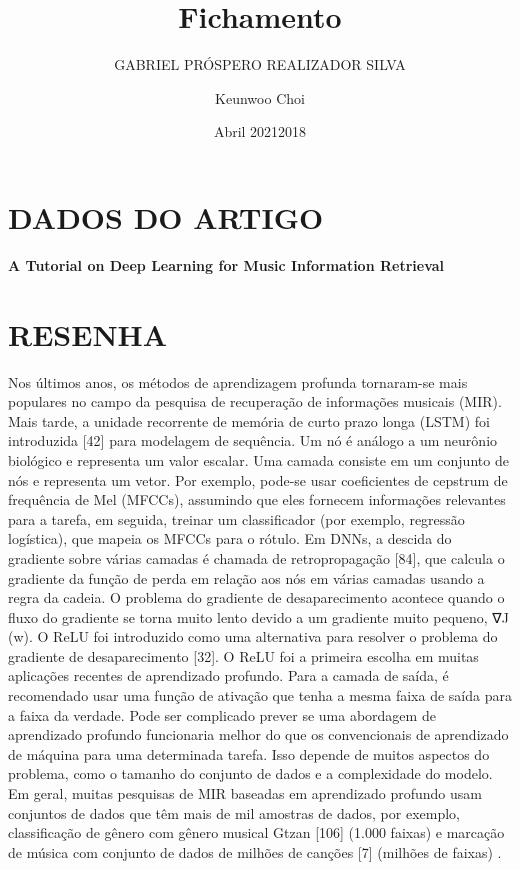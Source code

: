 \documentclass{article}
\title{Fichamento}
\author{GABRIEL PRÓSPERO REALIZADOR  SILVA}
\date{Abril 2021}
\begin{document}
\maketitle

\section{DADOS DO ARTIGO}
\textbf{A Tutorial on Deep Learning for Music Information Retrieval\\}
\author{Keunwoo Choi \\}
\date{2018}

\section{RESENHA}
Nos últimos anos, os métodos de aprendizagem profunda tornaram-se mais populares no campo da pesquisa de recuperação de informações musicais (MIR).
Mais tarde, a unidade recorrente de memória de curto prazo longa (LSTM) foi introduzida [42] para modelagem de sequência.
Um nó é análogo a um neurônio biológico e representa um valor escalar. Uma camada consiste em um conjunto de nós e representa um vetor.
Por exemplo, pode-se usar coeficientes de cepstrum de frequência de Mel (MFCCs), assumindo que eles fornecem informações relevantes para a tarefa, em seguida, treinar um classificador (por exemplo, regressão logística), que mapeia os MFCCs para o rótulo.
Em DNNs, a descida do gradiente sobre várias camadas é chamada de retropropagação [84], que calcula o gradiente da função de perda em relação aos nós em várias camadas usando a regra da cadeia.
O problema do gradiente de desaparecimento acontece quando o fluxo do gradiente se torna muito lento devido a um gradiente muito pequeno, ∇J (w).
O ReLU foi introduzido como uma alternativa para resolver o problema do gradiente de desaparecimento [32]. O ReLU foi a primeira escolha em muitas aplicações recentes de aprendizado profundo. Para a camada de saída, é recomendado usar uma função de ativação que tenha a mesma faixa de saída para a faixa da verdade.
Pode ser complicado prever se uma abordagem de aprendizado profundo funcionaria melhor do que os convencionais de aprendizado de máquina para uma determinada tarefa. Isso depende de muitos aspectos do problema, como o tamanho do conjunto de dados e a complexidade do modelo. Em geral, muitas pesquisas de MIR baseadas em aprendizado profundo usam conjuntos de dados que têm mais de mil amostras de dados, por exemplo, classificação de gênero com gênero musical Gtzan [106] (1.000 faixas) e marcação de música com conjunto de dados de milhões de canções [7] (milhões de faixas) .
\end{document}
